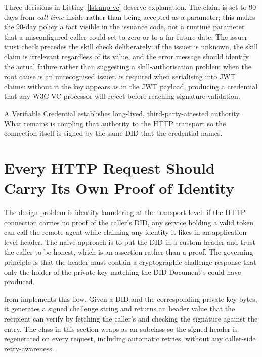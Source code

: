 Three decisions in Listing~\ref{lst:anp-vc} deserve explanation.
The  claim is set to 90 days from \emph{call time} inside
 rather than being accepted as a parameter;
this makes the 90-day policy a fact visible in the issuance code, not a
runtime parameter that a misconfigured caller could set to zero or to a
far-future date. The issuer trust check precedes the skill check
deliberately: if the issuer is unknown, the skill claim is irrelevant
regardless of its value, and the error message should identify the actual
failure rather than suggesting a skill-authorisation problem when the root
cause is an unrecognised issuer.  is
required when serialising  into JWT
claims: without it the  key appears as 
in the JWT payload, producing a credential that any W3C VC processor will
reject before reaching signature validation.

A Verifiable Credential establishes long-lived, third-party-attested
authority. What remains is coupling that authority to the HTTP transport
so the connection itself is signed by the same DID that the credential
names.


\section{Every HTTP Request Should Carry Its Own Proof of Identity}
\label{sec:anp-auth}

The design problem is identity laundering at the transport level: if the
HTTP connection carries no proof of the caller's DID, any service holding
a valid token can call the remote agent while claiming any identity it
likes in an application-level header. The naive approach is to put the DID
in a custom header and trust the caller to be honest, which is an
assertion rather than a proof. The governing principle is that the
 header must contain a cryptographic challenge
response that only the holder of the private key matching the DID
Document's  could have produced.

 from  implements this flow.
Given a DID and the corresponding private key bytes, it generates a
signed challenge string and returns an  header value
that the recipient can verify by fetching the caller's
 and checking the signature against the
 entry. The  class in
this section wraps  as an 
subclass so the signed header is regenerated on every request, including
automatic retries, without any caller-side retry-awareness.

